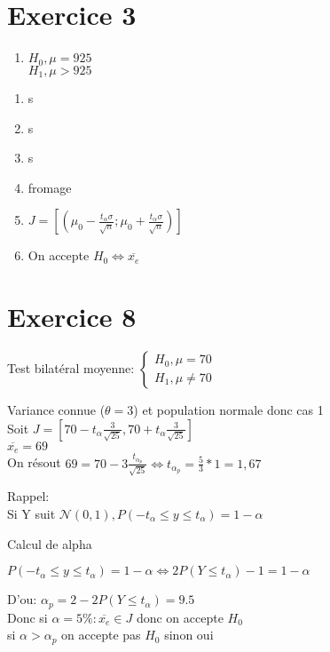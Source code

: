 \documentclass[12pt]{report}
\begin{document}
\section{Exercice 3}

\begin{enumerate}
    \item $H_0 , \mu = 925$ \\
          $H_1 , \mu > 925$ 

\end{enumerate}

\begin{enumerate}
    \item s
    \item s
    \item s
    \item fromage
    \item  $J = [(\mu_0 - \frac{t_\alpha \sigma}{\sqrt{n}};\mu_0 + \frac{t_\alpha \sigma}{\sqrt{n}})]$
    \item On accepte $H_0 \Leftrightarrow \overline{x_e}$
\end{enumerate}

\section{Exercice 8}

Test bilatéral moyenne:
$\begin{cases}
    H_0, \mu = 70\\
    H_1, \mu \neq 70
\end{cases}$

Variance connue ($\theta = 3$) et population normale donc cas 1\\
Soit $J = [70-t_\alpha \frac{3}{\sqrt{25}},70+t_\alpha \frac{3}{\sqrt{25}}]$\\
$\overline{x_e} = 69$\\
On résout $69 = 70 - 3 \frac{t_{\alpha_p} }{\sqrt{25}} \Leftrightarrow t_{\alpha_p} = \frac{5}{3}*1 = 1,67$

Rappel:\\
Si Y suit $\mathcal{N}(0,1), P(-t_{\alpha} \leq y \leq t_{\alpha}) = 1-\alpha$

Calcul de alpha

$P(-t_{\alpha} \leq y \leq t_{\alpha}) = 1-\alpha \Leftrightarrow 2 P(Y \leq t_{\alpha}) -1 = 1-\alpha$

D'ou: $\alpha_p =2 - 2P(Y \leq t_\alpha) = 9.5$\\
Donc si $\alpha = 5\% : \overline{x_e} \in J$ donc on accepte $H_0$\\
si $\alpha > \alpha_p$ on accepte pas $H_0$ sinon oui
\end{document}
